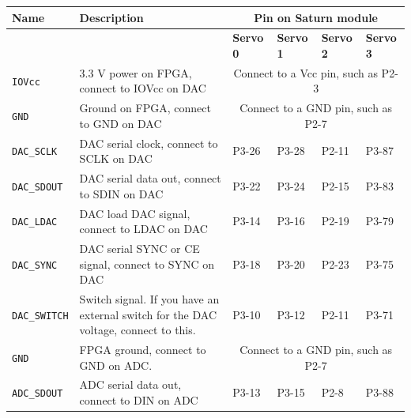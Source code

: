 \documentclass{article}
\begin{document}
\begin{longtable}[c]{|l|p{7cm}|l|l|l|l|}
	\hline
	\textbf{Name} 			&\textbf{Description}										&\multicolumn{4}{c|}{\textbf{Pin on Saturn module}}\\\hline
							&															&\textbf{Servo 0}	&\textbf{Servo 1}	&\textbf{Servo 2}	&\textbf{Servo 3}\\\hline
	\verb|IOVcc|			&3.3 V power on FPGA, connect to IOVcc on DAC				&\multicolumn{4}{c|}{Connect to a Vcc pin, such as P2-3}\\\hline
	\verb|GND|				&Ground on FPGA, connect to GND on DAC						&\multicolumn{4}{c|}{Connect to a GND pin, such as P2-7}\\\hline
	\verb|DAC_SCLK|			&DAC serial clock, connect to SCLK on DAC					&P3-26				&P3-28				&P2-11				&P3-87\\\hline
	\verb|DAC_SDOUT|		&DAC serial data out, connect to SDIN on DAC				&P3-22				&P3-24				&P2-15				&P3-83\\\hline
	\verb|DAC_LDAC|			&DAC load DAC signal, connect to LDAC on DAC				&P3-14				&P3-16				&P2-19				&P3-79\\\hline
	\verb|DAC_SYNC|			&DAC serial SYNC or CE signal, connect to SYNC on DAC		&P3-18				&P3-20				&P2-23				&P3-75\\\hline
	\verb|DAC_SWITCH|		&Switch signal.  If you have an external switch for the DAC voltage, connect to this.				&P3-10				&P3-12				&P2-11				&P3-71\\\hline
	\hline
	\verb|GND|				&FPGA ground, connect to GND on ADC.						&\multicolumn{4}{c|}{Connect to a GND pin, such as P2-7}\\\hline
	\verb|ADC_SDOUT|		&ADC serial data out, connect to DIN on ADC					&P3-13				&P3-15				&P2-8				&P3-88\\\hline

\end{longtable}
\end{document}
